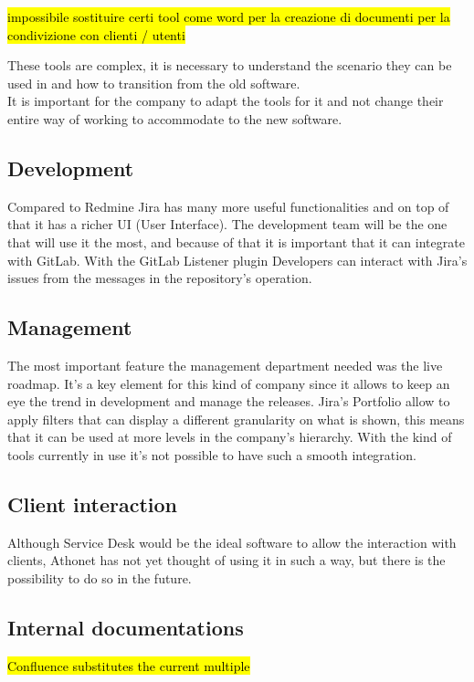 	\hl{impossibile sostituire certi tool come word per la creazione di documenti per la condivizione con clienti / utenti}
	
	These tools are complex, it is necessary to understand the scenario they can be used in and how to transition from the old software.\\
	It is important for the company to adapt the tools for it and not change their entire way of working to accommodate to the new software.

	\subsection{Development} 
		Compared to Redmine Jira has many more useful functionalities and on top of that it has a richer UI (User Interface).
		The development team will be the one that will use it the most, and because of that it is important that it can integrate with GitLab.
		With the GitLab Listener plugin Developers can interact with Jira's issues from the messages in the repository's operation.
	
	\subsection{Management} 
		The most important feature the management department needed was the live roadmap.	
		It's a key element for this kind of company since it allows to keep an eye the trend in development and manage the releases.
		Jira's Portfolio allow to apply filters that can display a different granularity on what is shown, this means that it can be used at more levels in the company's hierarchy.
		With the kind of tools currently in use it's not possible to have such a smooth integration.
	
	\subsection{Client interaction} 
		Although Service Desk would be the ideal software to allow the interaction with clients, Athonet has not yet thought of using it in such a way, but there is the possibility to do so in the future.
		
	\subsection{Internal documentations}
		\hl{Confluence substitutes the current multiple }
		
